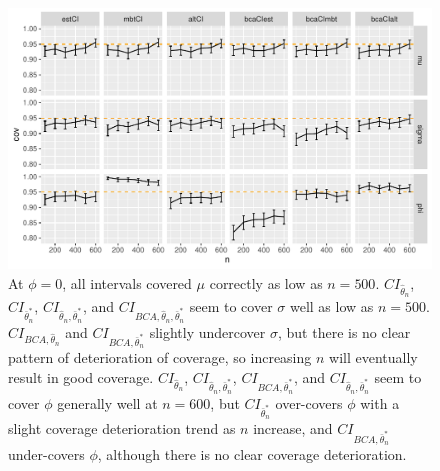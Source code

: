 \documentclass[12pt, letterpaper, titlepage]{article}
\begin{document}
\begin{figure}[tbp]
\caption{}
  \centering
  \includegraphics[width=\textwidth]{figures/plot_0}
  \caption{At $\phi = 0$, all intervals covered $\mu$ correctly as low as $n = 500$. $CI_{\hat{\theta}_{n}}$, $CI_{\bar\theta_n^*}$, $CI_{\hat{\theta}_{n}, \bar\theta_n^*}$, and $CI_{BCA, \hat{\theta}_{n}, \bar\theta_n^*}$ seem to cover $\sigma$ well as low as $n = 500$. $CI_{BCA, \hat{\theta}_{n}}$ and $CI_{BCA, \bar\theta_n^*}$ slightly undercover $\sigma$, but there is no clear pattern of deterioration of coverage, so increasing $n$ will eventually result in good coverage. $CI_{\hat{\theta}_{n}}$, $CI_{\hat{\theta}_{n}, \bar\theta_n^*}$, $CI_{BCA, \bar\theta_n^*}$, and $CI_{\hat{\theta}_{n}, \bar\theta_n^*}$ seem to cover $\phi$ generally well at $n = 600$, but $CI_{\bar\theta_n^*}$ over-covers $\phi$ with a slight coverage deterioration trend as $n$ increase, and $CI_{BCA, \bar\theta_n^*}$ under-covers $\phi$, although there is no clear coverage deterioration.}
  \label{fig:plot_0}
\end{figure}
\end{document}
